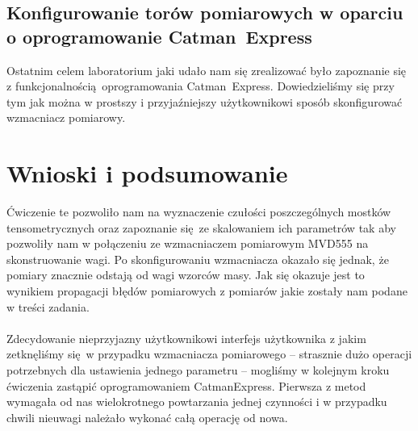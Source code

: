 \documentclass[a4paper, 12pt, titlepage]{article}
\begin{document}
		\subsection{Konfigurowanie torów pomiarowych w oparciu o oprogramowanie Catman\textregistered\ Express}
			Ostatnim celem laboratorium jaki udało nam się zrealizować było zapoznanie się z funkcjonalnością oprogramowania Catman\textregistered\ Express. Dowiedzieliśmy się przy tym jak można w prostszy i przyjaźniejszy użytkownikowi sposób skonfigurować wzmacniacz pomiarowy.
	\section{Wnioski i podsumowanie}
		Ćwiczenie te pozwoliło nam na wyznaczenie czułości poszczególnych mostków tensometrycznych oraz zapoznanie się ze skalowaniem ich parametrów tak aby pozwoliły nam w połączeniu ze wzmacniaczem pomiarowym MVD555 na skonstruowanie wagi. Po skonfigurowaniu wzmacniacza okazało się jednak, że pomiary znacznie odstają od wagi wzorców masy. Jak się okazuje jest to wynikiem propagacji błędów pomiarowych z pomiarów jakie zostały nam podane w treści zadania.
		\\
		\\
		Zdecydowanie nieprzyjazny użytkownikowi interfejs użytkownika z jakim zetknęliśmy się w przypadku wzmacniacza pomiarowego -- strasznie dużo operacji potrzebnych dla ustawienia jednego parametru -- mogliśmy w kolejnym kroku ćwiczenia zastąpić oprogramowaniem Catman\textregistered Express. Pierwsza z metod wymagała od nas wielokrotnego powtarzania jednej czynności i w przypadku chwili nieuwagi należało wykonać całą operację od nowa. 
\end{document}
